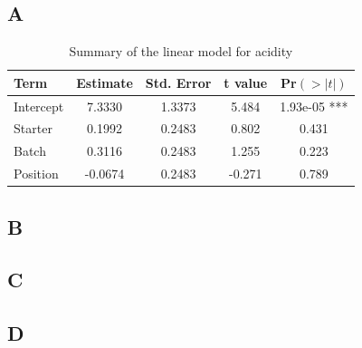 \documentclass{article}
\begin{document}
\subsection{A}

\begin{table}[H]
\centering
\begin{tabular}{lcccc}
\hline
\textbf{Term} & \textbf{Estimate} & \textbf{Std. Error} & \textbf{t value} & \textbf{Pr$(>|t|)$} \\
\hline
Intercept & 7.3330 & 1.3373 & 5.484 & 1.93e-05 *** \\
Starter & 0.1992 & 0.2483 & 0.802 & 0.431 \\
Batch & 0.3116 & 0.2483 & 1.255 & 0.223 \\
Position & -0.0674 & 0.2483 & -0.271 & 0.789 \\
\hline
\end{tabular}
\caption{Summary of the linear model for acidity}
\end{table}



\subsection{B}



\subsection{C}

\subsection{D}




\end{document}

